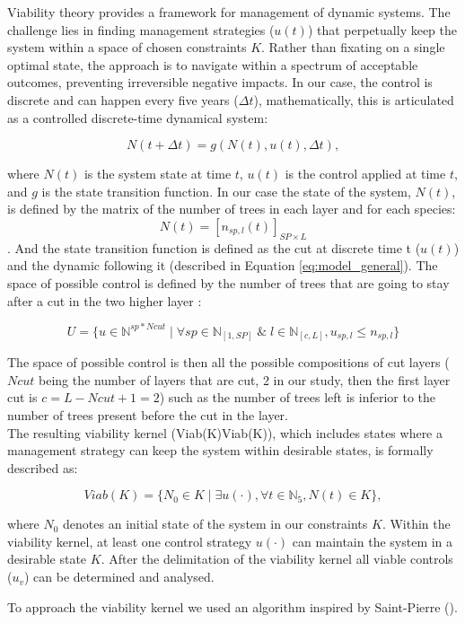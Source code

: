 \documentclass{article}
\begin{document}
Viability theory provides a framework for management of dynamic systems. The challenge lies in finding management strategies (\(u(t)\)) that perpetually keep the system within a space of chosen constraints $K$. Rather than fixating on a single optimal state, the approach is to navigate within a spectrum of acceptable outcomes, preventing irreversible negative impacts.
In our case, the control is discrete and can happen every five years ($\Delta t$), mathematically, this is articulated as a controlled discrete-time dynamical system:

\[
N(t+\Delta t) = g(N(t), u(t), \Delta t),
\]

where \(N(t)\) is the system state at time \(t\), \(u(t)\) is the control applied at time \(t\), and \(g\) is the state transition function. In our case the state of the system, \(N(t)\), is defined by the matrix of the number of trees in each layer and for each species: \[ N(t) = [n_{sp,l}(t)]_{SP \times L} \]. And the state transition function is defined as the cut at discrete time t (\(u(t)\)) and the dynamic following it (described in Equation \eqref{eq:model_general}). The space of possible control is defined by the number of trees that are going to stay after a cut in the two higher layer :

\[
     U = \{u \in \mathbb{N}^{sp*Ncut} \mid \forall sp \in \mathbb{N}_{[1,SP]} \; \& \; l \in \mathbb{N}_{[c,L]}, u_{sp,l} \leq n_{sp,l}\}
\]

The space of possible control is then all the possible compositions of cut layers ($Ncut$ being the number of layers that are cut, 2 in our study, then the first layer cut is $c = L-Ncut+1 = 2$) such as the number of trees left is inferior to the number of trees present before the cut in the layer.\\

The resulting viability kernel (Viab(K)Viab(K)), which includes states where a management strategy can keep the system within desirable states, is formally described as:

\[
Viab(K) = \{N_0 \in K \mid\exists u(\cdot), \forall t \in \mathbb{N}_5, N(t) \in K\},
\]

where \(N_0\) denotes an initial state of the system in our constraints $K$. Within the viability kernel, at least one control strategy $u(\cdot)$ can maintain the system in a desirable state $K$. After the delimitation of the viability kernel all viable controls (\(u_v\)) can be determined and analysed.

To approach the viability kernel we used an algorithm inspired by Saint-Pierre (\autocite{saint-pierreApproximationViabilityKernel1994}).
\end{document}
